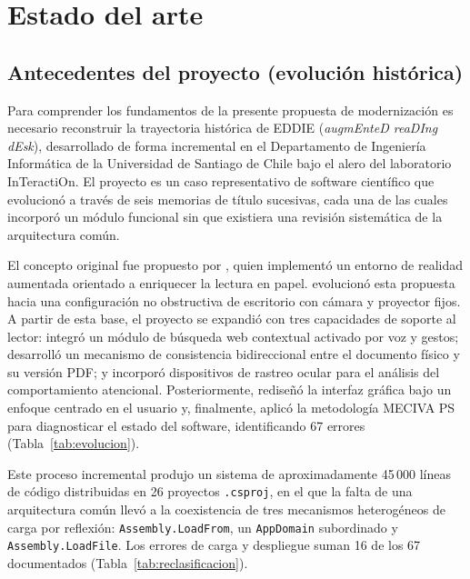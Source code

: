 \section{Estado del arte}

\subsection{Antecedentes del proyecto (evolución histórica)}

Para comprender los fundamentos de la presente propuesta de modernización es necesario reconstruir la trayectoria histórica de EDDIE (\textit{augmEnteD reaDIng dEsk}), desarrollado de forma incremental en el Departamento de Ingeniería Informática de la Universidad de Santiago de Chile bajo el alero del laboratorio InTeractiOn. El proyecto es un caso representativo de software científico que evolucionó a través de seis memorias de título sucesivas, cada una de las cuales incorporó un módulo funcional sin que existiera una revisión sistemática de la arquitectura común.

El concepto original fue propuesto por \citet{carrasco2017}, quien implementó un entorno de realidad aumentada orientado a enriquecer la lectura en papel. \citet{contreras2019} evolucionó esta propuesta hacia una configuración no obstructiva de escritorio con cámara y proyector fijos. A partir de esta base, el proyecto se expandió con tres capacidades de soporte al lector: \citet{montanares2019} integró un módulo de búsqueda web contextual activado por voz y gestos; \citet{pezoa2020} desarrolló un mecanismo de consistencia bidireccional entre el documento físico y su versión PDF; y \citet{estay2020} incorporó dispositivos de rastreo ocular para el análisis del comportamiento atencional. Posteriormente, \citet{santibanez2020} rediseñó la interfaz gráfica bajo un enfoque centrado en el usuario y, finalmente, \citet{ibaceta2023} aplicó la metodología MECIVA PS para diagnosticar el estado del software, identificando 67 errores (Tabla~\ref{tab:evolucion}).

Este proceso incremental produjo un sistema de aproximadamente 45\,000 líneas de código distribuidas en 26 proyectos \texttt{.csproj}, en el que la falta de una arquitectura común llevó a la coexistencia de tres mecanismos heterogéneos de carga por reflexión: \texttt{Assembly.LoadFrom}, un \texttt{AppDomain} subordinado y \texttt{Assembly.LoadFile}. Los errores de carga y despliegue suman 16 de los 67 documentados (Tabla~\ref{tab:reclasificacion}).

